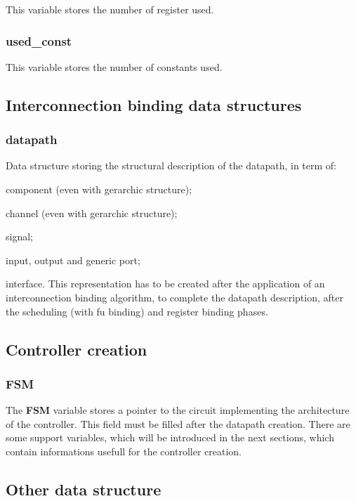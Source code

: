This variable stores the number of register used. \hypertarget{src_HLS_page_used_const}{}\subsubsection{used\+\_\+const}\label{src_HLS_page_used_const}
This variable stores the number of constants used. \hypertarget{src_HLS_page_src_HLS_data_structure_datapath}{}\subsection{Interconnection binding data structures}\label{src_HLS_page_src_HLS_data_structure_datapath}
\hypertarget{src_HLS_page_datapath}{}\subsubsection{datapath}\label{src_HLS_page_datapath}
Data structure storing the structural description of the datapath, in term of\+:
\begin{DoxyItemize}
\item component (even with gerarchic structure);
\item channel (even with gerarchic structure);
\item signal;
\item input, output and generic port;
\item interface. This representation has to be created after the application of an interconnection binding algorithm, to complete the datapath description, after the scheduling (with fu binding) and register binding phases. 
\end{DoxyItemize}\hypertarget{src_HLS_page_src_HLS_data_structure_fsm}{}\subsection{Controller creation}\label{src_HLS_page_src_HLS_data_structure_fsm}
\hypertarget{src_HLS_page_FSM}{}\subsubsection{F\+SM}\label{src_HLS_page_FSM}
The {\bfseries F\+SM} variable stores a pointer to the circuit implementing the architecture of the controller. This field must be filled after the datapath creation. There are some support variables, which will be introduced in the next sections, which contain informations usefull for the controller creation. \hypertarget{src_HLS_page_src_HLS_data_structure_other}{}\subsection{Other data structure}\label{src_HLS_page_src_HLS_data_structure_other}
